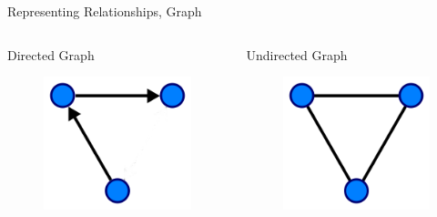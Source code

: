\documentclass{beamer}
\begin{document}
\begin{frame}{Representing Relationships, Graph}
	\begin{columns}
		\begin{block}{Directed Graph}
			\begin{figure}[ht]
				\centering
				\includegraphics[scale=0.18]{fig/APIS/Directed1.png}
				\label{DG}
			\end{figure}
		\end{block}
		
		\begin{block}{Undirected Graph}
			\begin{figure}[ht]
				\centering
				\includegraphics[scale=0.18]{fig/APIS/Undirected.png}
				\label{UDG}
			\end{figure}
		\end{block}
		
	\end{columns}
\end{frame}
\end{document}
